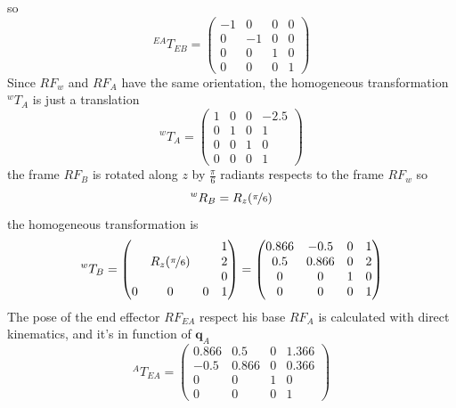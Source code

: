\documentclass[10pt, letterpaper]{report}
\begin{document}
so\begin{equation}
    {}^{EA}T_{EB}=\begin{pmatrix}
        -1&0&0&0\\ 
        0&-1&0&0\\
        0&0&1&0\\ 
        0&0&0&1
    \end{pmatrix}
\end{equation}
Since $RF_w$ and $RF_A$ have the same orientation, the homogeneous transformation ${}^wT_A$ is just a translation\begin{equation}
    {}^wT_A=\begin{pmatrix}
        1&0&0&-2.5\\ 
        0&1&0&1\\
        0&0&1&0\\ 
        0&0&0&1\end{pmatrix}
\end{equation}
the frame $RF_B$ is rotated along $z$ by $\frac{\pi}{6}$ radiants respects to the frame $RF_w$ so\begin{equation}
    {}^wR_B=R_z(\nicefrac{\pi}{6})
\end{equation}
the homogeneous transformation is\begin{equation}
     {}^wT_B=\begin{pmatrix}
        &&&1\\ 
        &R_z(\nicefrac{\pi}{6})&&2\\
        &&&0\\
        0&0&0&1
     \end{pmatrix}=\begin{pmatrix}
        0.866&-0.5&0&1\\ 
        0.5&0.866&0&2\\
        0&0&1&0\\
        0&0&0&1
     \end{pmatrix}
\end{equation}
The pose of the end effector $RF_{EA}$ respect his base $RF_A$ is calculated with direct kinematics, and it's in function of $\mathbf q_A$\begin{equation}
    {}^AT_{EA}=\begin{pmatrix}
        0.866&0.5&0&1.366\\ 
        -0.5&0.866&0&0.366\\
        0&0&1&0\\
        0&0&0&1
     \end{pmatrix}
\end{equation}
\end{document}
